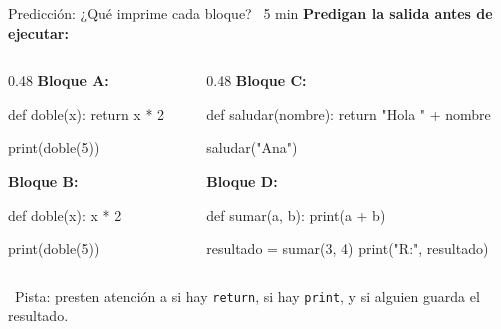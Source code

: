 \documentclass[aspectratio=169, 11pt]{beamer}
\begin{document}
\begin{frame}[fragile,shrink=30]{Predicción: ¿Qué imprime cada bloque? \hfill
    {\normalsize\color{arcaRed}\faClock\ 5 min}}
  \vspace{-6pt}
  {\footnotesize\color{arcaDark}\bfseries
    Predigan la salida \textbf{antes} de ejecutar:}

  \vspace{2pt}
  \begin{columns}[T]
    \begin{column}{0.48\textwidth}
      {\scriptsize\color{arcaRed}\bfseries Bloque A:}
      \begin{pyblock}
def doble(x):
    return x * 2

print(doble(5))
      \end{pyblock}

      \vspace{2pt}
      {\scriptsize\color{arcaRed}\bfseries Bloque B:}
      \begin{pyblock}
def doble(x):
    x * 2

print(doble(5))
      \end{pyblock}
    \end{column}

    \begin{column}{0.48\textwidth}
      {\scriptsize\color{arcaRed}\bfseries Bloque C:}
      \begin{pyblock}
def saludar(nombre):
    return "Hola " + nombre

saludar("Ana")
      \end{pyblock}

      \vspace{2pt}
      {\scriptsize\color{arcaRed}\bfseries Bloque D:}
      \begin{pyblock}
def sumar(a, b):
    print(a + b)

resultado = sumar(3, 4)
print("R:", resultado)
      \end{pyblock}
    \end{column}
  \end{columns}

  \vspace{2pt}
  {\scriptsize\color{textMuted}
    \faLightbulb\ Pista: presten atención a si hay \texttt{return},
    si hay \texttt{print}, y si alguien guarda el resultado.}
\end{frame}
\end{document}
